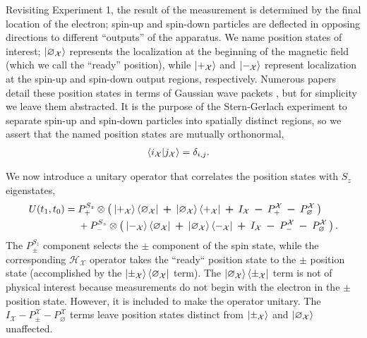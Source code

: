 Revisiting Experiment 1, the result of the measurement is determined by the final location of the electron; spin-up and spin-down particles are deflected in opposing directions to different ``outputs'' of the apparatus. We name position states of interest; $\ket{\varnothing_\mathcal{X}}$ represents the localization at the beginning of the magnetic field (which we call the ``ready'' position), while $\ket{+_{\mathcal{X}}}$ and $\ket{-_{\mathcal{X}}}$ represent localization at the spin-up and spin-down output regions, respectively. Numerous papers detail these position states in terms of Gaussian wave packets \cite{Venugopalan}, but for simplicity we leave them abstracted. It is the purpose of the Stern-Gerlach experiment to separate spin-up and spin-down particles into spatially distinct regions, so we assert that the named position states are mutually orthonormal,
\begin{align}
  \braket{i_\mathcal{X}| j_\mathcal{X}} &= \delta_{i,j}.
\end{align}

We now introduce a unitary operator that correlates the position states with $S_z$ eigenstates,
\begin{align} \label{eq: Experiment 1 unitary operator}
  U(t_1, t_0) &= P^{S_z}_+ \otimes \left(\: \ket{+_{\mathcal{X}}}\bra{\varnothing_\mathcal{X}} \: \bm{+} \: \ket{\varnothing_\mathcal{X}}\bra{+_\mathcal{X}} \: \bm{+} \: I_\mathcal{X} \: \bm{-} \: P^\mathcal{X}_+  \: \bm{-} \: P^\mathcal{X}_\varnothing \: \right) \\ \nonumber
  &\phantom{{}={}} + P^{S_z}_- \otimes \left( \: \ket{-_{\mathcal{X}}}\bra{\varnothing_\mathcal{X}} \: \bm{+} \: \ket{\varnothing_\mathcal{X}}\bra{-_\mathcal{X}} \: \bm{+} \: I_\mathcal{X} \: \bm{-} \: P^\mathcal{X}_-  \: \bm{-} \: P^\mathcal{X}_\varnothing \: \right).
\end{align}
The $P^{S_z}_\pm$ component selects the $\pm$ component of the spin state, while the corresponding $\mathcal{H}_\mathcal{X}$ operator takes the ``ready`` position state to the $\pm$ position state (accomplished by the $\ket{\pm_\mathcal{X}}\bra{\varnothing_\mathcal{X}}$ term). The $\ket{\varnothing_\mathcal{X}}\bra{\pm_\mathcal{X}}$ term is not of physical interest because measurements do not begin with the electron in the $\pm$ position state. However, it is included to make the operator unitary. The $I_\mathcal{X} - P^\mathcal{X}_\pm - P^\mathcal{X}_\varnothing$ terms leave position states distinct from $\ket{\pm_\mathcal{X}}$ and $\ket{\varnothing_\mathcal{X}}$ unaffected.

